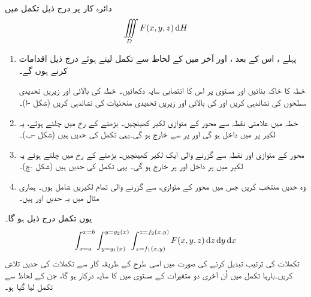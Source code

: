 \\
دائرہ کار  پر درج ذیل تکمل میں  
\begin{align*}
\iiint\limits_D F(x,y,z)\dif H
\end{align*}
\begin{enumerate}[1.]
\item
پہلے  ، اس کے بعد  ، اور آخر میں    کے لحاظ سے تکمل لیتے ہوئے  درج ذیل اقدامات کرنے ہوں گے۔

\quad
خطہ  کا خاکہ بنائیں اور مستوی  پر  اس کا انتصابی سایہ   دکھائیں۔  خطہ  کی بالائی اور زیریں تحدیدی سطحوں کی نشاندہی کریں اور  کی بالائی اور زیریں تحدیدی منحنیات  کی نشاندہی کریں (شکل -ا)۔
\item
{}\quad
خطہ  میں  علامتی نقطہ  سے محور  کے متوازی  لکیر  کھینچیں۔  بڑھتے   کے  رخ میں چلتے ہوئے،  یہ لکیر  پر  میں داخل ہو گی اور   پر  سے خارج ہو گی۔یہی تکمل کی   حدیں ہیں (شکل -ب)۔
\item
{}\quad
محور  کے متوازی   اور  نقطہ  سے گزرنے والی  ایک لکیر  کھینچیں۔ بڑھتے   کے  رخ میں  چلتے ہوئے  یہ لکیر  میں  پر داخل اور  پر خارج ہو گی۔ یہی تکمل کی  حدیں ہیں (شکل -ج)۔
\item
{}\quad
وہ  حدیں منتخب کریں جس میں  محور  کے متوازی،   سے گزرنے والی  تمام لکیریں    شامل ہوں۔ ہماری مثال میں  یہ حدیں   اور  ہیں۔
\end{enumerate}
یوں تکمل درج ذیل ہو گا۔
\begin{align*}
\int_{x=a}^{x=b}\int_{y=g_1(x)}^{y=g_2(x)}\int_{z=f_1(x,y)}^{z=f_2(x,y)}F(x,y,z)\dif z\dif y\dif x
\end{align*}
تکملات کی ترتیب  تبدیل کرنے کی صورت میں اسی طرح کے طریقہ کار سے تکملات کی حدیں تلاش کریں۔بارہا تکمل میں  اُن  آخری دو متغیرات کے مستوی   میں  کا سایہ درکار ہو گا،  جن کے لحاظ سے تکمل لیا  گیا ہو۔


